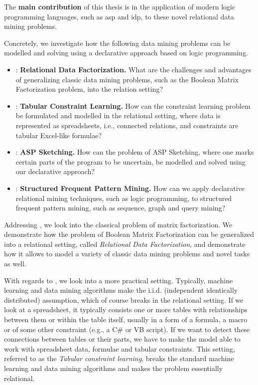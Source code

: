 The \textbf{main contribution} of this thesis is in the application of
modern logic programming languages, such as \acrshort{asp} and
\acrshort{idp}, to these novel relational data mining problems.


Concretely, we investigate how the following data mining problems
can be modelled and solving using a declarative approach based on
logic programming.
\begin{itemize}
    \item \cone: \textbf{Relational Data Factorization.} What are the challenges and advantages of generalizing
    classic data mining problems, such as the Boolean Matrix
    Factorization problem, into the relation setting?
  \item \ctwo: \textbf{Tabular Constraint Learning.} How can the constraint learning problem be formulated
   and modelled in the relational setting, where data is
   represented as spreadsheets, i.e., connected relations, and constraints are
   tabular Excel-like formulae?
  \item \cthree: \textbf{ASP Sketching.} How can the problem of ASP
      Sketching, where one marks certain parts of the
        program to be uncertain, be modelled and solved using our
        declarative approach? 
   \item \cfour: \textbf{Structured Frequent Pattern Mining.}
    How can we apply declarative relational mining
    techniques, such as logic programming, to structured frequent pattern mining, such as sequence, graph
    and query mining?
\end{itemize}

Addressing \cone, we look into the classical problem of matrix
factorization. We demonstrate how the problem of Boolean Matrix
Factorization can be generalized into  a relational setting, called
\textit{Relational Data Factorization}, and
demonstrate how it allows to model a variety of classic data mining
problems and novel tasks as well.

With regards to \ctwo, we look into a more practical setting.
Typically, machine learning and data mining algorithms make the i.i.d.
(independent identically distributed) assumption, which of course
breaks in the relational setting. If we look at a spreadsheet, it 
typically consists one or more tables with relationships between them or
within the table itself, usually
in a form of a formula, a macro or of some other constraint (e.g., a
C\# or VB script). If we
want to detect these connections between tables or their parts, we
have to make the model able to work with spreadsheet data, 
formulae and tabular constraints. This setting, referred to as the
\textit{Tabular constraint learning}, breaks the standard
machine learning and data mining algorithms and 
makes the problem essentially relational.

